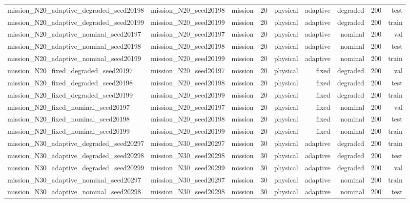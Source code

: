 \begin{tabular}{lrrrrrrrr}
mission\_N20\_adaptive\_degraded\_seed20198 & mission\_N20\_seed20198 & mission & 20 & physical & adaptive & degraded & 200 & test \\
mission\_N20\_adaptive\_degraded\_seed20199 & mission\_N20\_seed20199 & mission & 20 & physical & adaptive & degraded & 200 & train \\
mission\_N20\_adaptive\_nominal\_seed20197 & mission\_N20\_seed20197 & mission & 20 & physical & adaptive & nominal & 200 & val \\
mission\_N20\_adaptive\_nominal\_seed20198 & mission\_N20\_seed20198 & mission & 20 & physical & adaptive & nominal & 200 & test \\
mission\_N20\_adaptive\_nominal\_seed20199 & mission\_N20\_seed20199 & mission & 20 & physical & adaptive & nominal & 200 & train \\
mission\_N20\_fixed\_degraded\_seed20197 & mission\_N20\_seed20197 & mission & 20 & physical & fixed & degraded & 200 & val \\
mission\_N20\_fixed\_degraded\_seed20198 & mission\_N20\_seed20198 & mission & 20 & physical & fixed & degraded & 200 & test \\
mission\_N20\_fixed\_degraded\_seed20199 & mission\_N20\_seed20199 & mission & 20 & physical & fixed & degraded & 200 & train \\
mission\_N20\_fixed\_nominal\_seed20197 & mission\_N20\_seed20197 & mission & 20 & physical & fixed & nominal & 200 & val \\
mission\_N20\_fixed\_nominal\_seed20198 & mission\_N20\_seed20198 & mission & 20 & physical & fixed & nominal & 200 & test \\
mission\_N20\_fixed\_nominal\_seed20199 & mission\_N20\_seed20199 & mission & 20 & physical & fixed & nominal & 200 & train \\
mission\_N30\_adaptive\_degraded\_seed20297 & mission\_N30\_seed20297 & mission & 30 & physical & adaptive & degraded & 200 & train \\
mission\_N30\_adaptive\_degraded\_seed20298 & mission\_N30\_seed20298 & mission & 30 & physical & adaptive & degraded & 200 & test \\
mission\_N30\_adaptive\_degraded\_seed20299 & mission\_N30\_seed20299 & mission & 30 & physical & adaptive & degraded & 200 & val \\
mission\_N30\_adaptive\_nominal\_seed20297 & mission\_N30\_seed20297 & mission & 30 & physical & adaptive & nominal & 200 & train \\
mission\_N30\_adaptive\_nominal\_seed20298 & mission\_N30\_seed20298 & mission & 30 & physical & adaptive & nominal & 200 & test \\

\end{tabular}
